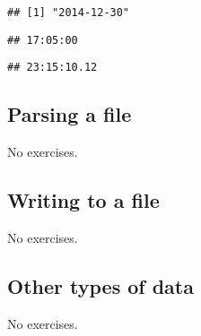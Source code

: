 \documentclass[]{article}
\newenvironment{Shaded}{\begin{snugshade}}{\end{snugshade}}
\newcommand{\KeywordTok}[1]{\textcolor[rgb]{0.13,0.29,0.53}{\textbf{#1}}}
\newcommand{\StringTok}[1]{\textcolor[rgb]{0.31,0.60,0.02}{#1}}
\newcommand{\CommentTok}[1]{\textcolor[rgb]{0.56,0.35,0.01}{\textit{#1}}}
\newcommand{\NormalTok}[1]{#1}
\theoremstyle{definition}
\theoremstyle{definition}
\theoremstyle{definition}
\theoremstyle{remark}
\begin{document}
\begin{Shaded}
\end{Shaded}

\begin{verbatim}
## [1] "2014-12-30"
\end{verbatim}

\begin{Shaded}
\end{Shaded}

\begin{verbatim}
## 17:05:00
\end{verbatim}

\begin{Shaded}
\end{Shaded}

\begin{verbatim}
## 23:15:10.12
\end{verbatim}

\subsection{Parsing a file}\label{parsing-a-file}

No exercises.

\subsection{Writing to a file}\label{writing-to-a-file}

No exercises.

\subsection{Other types of data}\label{other-types-of-data}

No exercises.
\end{document}

